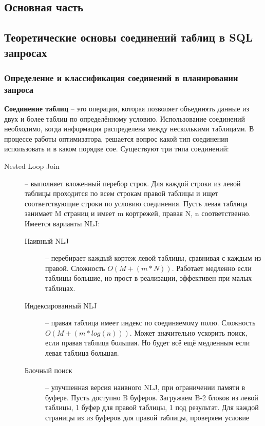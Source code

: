 \documentclass[12pt]{article}
\begin{document}
\begin{flushleft}

\centering \section*{Основная часть}
\centering \subsection*{Теоретические основы соединений таблиц в SQL запросах}
\centering \subsubsection*{Определение и классификация соединений в планировании запроса}
\raggedright
\textbf{Соединение таблиц} -- это операция, которая позволяет объединять данные
из двух и более таблиц по определённому условию. Использование соединений необходимо,
когда информация распределена между несколькими таблицами. В процессе работы оптимизатора,
решается вопрос какой тип соединения использовать и в каком порядке сое. 
Существуют три типа соединений:
\begin{description}
    \item[Nested Loop Join] -- выполняет вложенный перебор строк. 
    Для каждой строки из левой таблицы проходится по всем строкам правой таблицы 
    и ищет соответствующие строки по условию соединения. Пусть левая таблица 
    занимает M страниц и имеет m кортрежей, правая N, n соответственно. Имеется 
    варианты NLJ:
    \begin{description}
        \item[Наивный NLJ] -- перебирает каждый кортеж левой таблицы, 
        сравнивая с каждым из правой. Сложность $O(M+(m*N))$. Работает медленно 
        если таблицы большие, но прост в реализации, эффективен при малых 
        таблицах.
        \item[Индексированный NLJ] -- правая таблица имеет индекс по соединяемому 
        полю. Сложность $O(M+(m*log(n)))$. Может значительно ускорить поиск, если 
        правая таблица большая. Но будет всё ещё медленным если левая таблица 
        большая.
        \item[Блочный поиск] -- улучшенная версия наивного NLJ, при
        ограничении памяти в буфере. Пусть доступно B буферов. Загружаем B-2 
        блоков из левой таблицы, 1 буфер для правой таблицы, 1 под результат. 
        Для каждой страницы из из буферов для правой таблицы, проверяем условие 

\end{description}
\end{description}
\end{flushleft}
\end{document}
